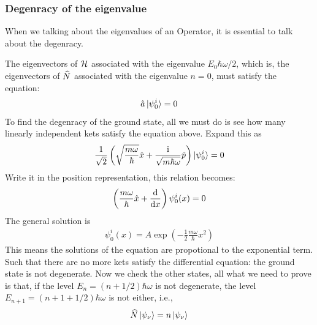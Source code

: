 \subsubsection{Degenracy of the eigenvalue}
When we talking about the eigenvalues of an Operator, it is essential to talk about the degenracy. 

The eigenvectors of $\mathcal{H}$ associated with the eigenvalue $E_0 \hbar \omega/2$, which is, the eigenvectors of $\widehat{N}$ associated with the eigenvalue $n=0$, must satisfy the equation: 
\begin{eqnarray}
    \hat{a} \ket{\psi_0 ^i} = 0
\end{eqnarray}
To find the degenracy of the ground state, all we must do is see how many linearly independent kets satisfy the equation above. Expand this as 
\begin{eqnarray}
    \frac{1}{\sqrt{2}} \left( \sqrt{\frac{m \omega}{\hbar}} \hat{x} + \frac{\mathrm{i}}{\sqrt{m \hbar \omega}}\hat{p} \right) \ket{\psi_0 ^i} = 0
\end{eqnarray}
Write it in the position representation, this relation becomes: 
\begin{eqnarray}
    \left(\frac{m\omega}{\hbar}\hat{x} + \frac{\mathrm{d}}{\mathrm{d} x}\right) \psi_0^i(x) = 0
\end{eqnarray}
The general solution is 
\begin{eqnarray}
    \psi_0^i (x) = A \exp\left(- \frac{1}{2} \frac{m \omega}{\hbar} x^2\right)
\end{eqnarray}
This means the solutions of the equation are propotional to the exponential term. Such that there are no more kets satisfy the differential equation: the ground state is not degenerate. 
Now we check the other states, all what we need to prove is that, if the level $E_n = (n + 1/2)\hbar \omega$ is not degenerate, the level $E_{n+1} = (n+1 + 1/2)\hbar \omega$ is not either, i.e., 
\begin{eqnarray}
    \widehat{N} \ket{\psi_ \nu} = n \ket{\psi_ \nu}
\end{eqnarray} 


